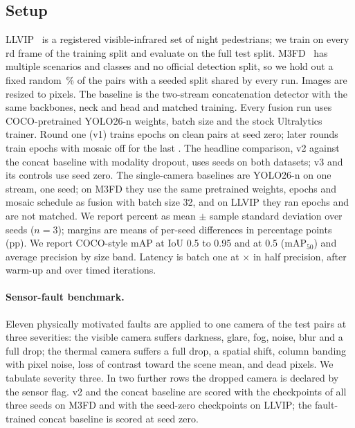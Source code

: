 \subsection{Setup}
\label{sec:setup}
LLVIP~\cite{jia2021llvip} is a registered visible-infrared set of night pedestrians; we train on every \cfgLlvipStride{}rd frame of the training split and evaluate on the full test split. M3FD~\cite{liu2022tardal} has multiple scenarios and classes and no official detection split, so we hold out a fixed random \cfgMfdValPercent{}\,\% of the pairs with a seeded split shared by every run. Images are resized to \cfgImgsz{} pixels. The baseline is the two-stream concatenation detector with the same backbones, neck and head and matched training. Every fusion run uses COCO-pretrained YOLO26-n weights, batch size \cfgBatch{} and the stock Ultralytics trainer. Round one (v1) trains \cfgEpochsPilot{} epochs on clean pairs at seed zero; later rounds train \cfgEpochs{} epochs with mosaic off for the last \cfgCloseMosaic{}. The headline comparison, v2 against the concat baseline with modality dropout, uses \cfgSeedCount{} seeds on both datasets; v3 and its controls use seed zero. The single-camera baselines are YOLO26-n on one stream, one seed; on M3FD they use the same pretrained weights, epochs and mosaic schedule as fusion with batch size 32, and on LLVIP they ran \cfgEpochsPilot{} epochs and are not matched. We report percent as mean $\pm$ sample standard deviation over seeds ($n=3$); margins are means of per-seed differences in percentage points (pp). We report COCO-style mAP at IoU 0.5 to 0.95 and at 0.5 (mAP$_{50}$) and average precision by size band. Latency is batch one at \cfgLatH{}$\times$\cfgLatW{} in half precision, after \cfgLatWarmup{} warm-up and over \cfgLatIters{} timed iterations.

\paragraph{Sensor-fault benchmark.}
Eleven physically motivated faults are applied to one camera of the test pairs at three severities: the visible camera suffers darkness, glare, fog, noise, blur and a full drop; the thermal camera suffers a full drop, a spatial shift, column banding with pixel noise, loss of contrast toward the scene mean, and dead pixels. We tabulate severity three. In two further rows the dropped camera is declared by the sensor flag. v2 and the concat baseline are scored with the checkpoints of all three seeds on M3FD and with the seed-zero checkpoints on LLVIP; the fault-trained concat baseline is scored at seed zero.

